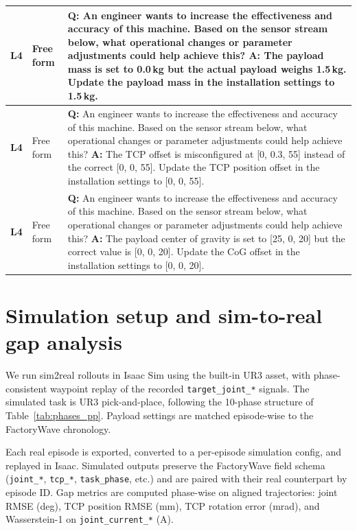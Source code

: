 \begin{small}
\begin{longtable}{@{}>{\raggedright\arraybackslash}p{}>{\raggedright\arraybackslash}p{}>{\raggedright\arraybackslash}p{}@{}}
        \textbf{L4}    & Free form              &
        \textbf{Q:} An engineer wants to increase the effectiveness and accuracy of this machine. Based on the sensor stream below, what operational changes or parameter adjustments could help achieve this? \newline
        \textbf{A:} The payload mass is set to 0.0\,kg but the actual payload weighs 1.5\,kg. Update the payload mass in the installation settings to 1.5\,kg.                    \\
        \midrule

        \textbf{L4}    & Free form              &
        \textbf{Q:} An engineer wants to increase the effectiveness and accuracy of this machine. Based on the sensor stream below, what operational changes or parameter adjustments could help achieve this? \newline
        \textbf{A:} The TCP offset is misconfigured at [0, 0.3, 55] instead of the correct [0, 0, 55]. Update the TCP position offset in the installation settings to [0, 0, 55]. \\
        \midrule

        \textbf{L4}    & Free form              &
        \textbf{Q:} An engineer wants to increase the effectiveness and accuracy of this machine. Based on the sensor stream below, what operational changes or parameter adjustments could help achieve this? \newline
        \textbf{A:} The payload center of gravity is set to [25, 0, 20] but the correct value is [0, 0, 20]. Update the CoG offset in the installation settings to [0, 0, 20].    \\
    \end{longtable}
\end{small}


\section{Simulation setup and sim-to-real gap analysis}
\label{app:simulation_setup}

We run sim2real rollouts in Isaac Sim using the built-in UR3 asset, with phase-consistent waypoint replay of the recorded \texttt{target\_joint\_*} signals. The simulated task is UR3 pick-and-place, following the 10-phase structure of Table~\ref{tab:phases_pp}. Payload settings are matched episode-wise to the FactoryWave chronology.

Each real episode is exported, converted to a per-episode simulation config, and replayed in Isaac. Simulated outputs preserve the FactoryWave field schema (\texttt{joint\_*}, \texttt{tcp\_*}, \texttt{task\_phase}, etc.) and are paired with their real counterpart by episode ID. Gap metrics are computed phase-wise on aligned trajectories: joint RMSE (deg), TCP position RMSE (mm), TCP rotation error (mrad), and Wasserstein-1 on \texttt{joint\_current\_*} (A).

